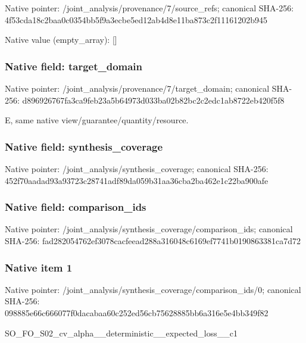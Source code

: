 \documentclass[10pt,a4paper]{article}
\begin{document}
Native pointer: /joint\_analysis/provenan\allowbreak{}ce/7/source\_refs; canonical SHA-256: 4f53cda18c2baa0c0354bb5f\allowbreak{}9a3ecbe5ed12ab4d8e11ba87\allowbreak{}3c2f11161202b945



Native value (empty\_array): []



\subsubsection{Native field: target\_domain}


Native pointer: /joint\_analysis/provenan\allowbreak{}ce/7/target\_domain; canonical SHA-256: d896926767fa3ca9feb23a5b\allowbreak{}64973d033ba02b82bc2c2edc\allowbreak{}1ab8722eb420f5f8


E, same native view/guarantee/quantity/resource.


\subsubsection{Native field: synthesis\_coverage}


Native pointer: /joint\_analysis/synthesis\_coverage; canonical SHA-256: 452f70aadad93a93723c2874\allowbreak{}1adf89da059b31aa36cba2ba\allowbreak{}462e1c22ba900afe



\subsubsection{Native field: comparison\_ids}


Native pointer: /joint\_analysis/synthesi\allowbreak{}s\_coverage/comparison\_id\allowbreak{}s; canonical SHA-256: fad282054762ef3078cacfee\allowbreak{}ad288a316048c6169ef7741b\allowbreak{}0190863381ca7d72



\subsubsection{Native item 1}


Native pointer: /joint\_analysis/synthesi\allowbreak{}s\_coverage/comparison\_id\allowbreak{}s/0; canonical SHA-256: 098885e66c666077f0dacaba\allowbreak{}a60c252ed56cb75628885bb6\allowbreak{}a316e5e4bb349f82


SO\_FO\_S02\_cv\_alpha\_\_dete\allowbreak{}rministic\_\_expected\_loss\allowbreak{}\_\_c1
\end{document}
